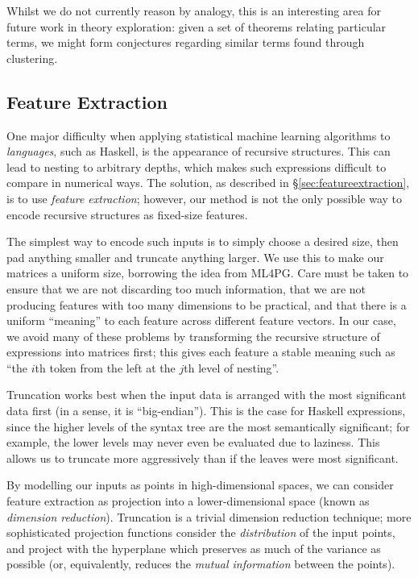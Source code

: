 Whilst we do not currently reason by analogy, this is an interesting area for future work in theory exploration: given a set of theorems relating particular terms, we might form conjectures regarding similar terms found through clustering.

\iffalse
We could expand this a bit, e.g. talking about how we both use Weka, etc.
\fi

\subsection{Feature Extraction}

One major difficulty when applying statistical machine learning algorithms to \emph{languages}, such as Haskell, is the appearance of recursive structures. This can lead to nesting to arbitrary depths, which makes such expressions difficult to compare in numerical ways. The solution, as described in \S \ref{sec:featureextraction}, is to use \emph{feature extraction}; however, our method is not the only possible way to encode recursive structures as fixed-size features.

The simplest way to encode such inputs is to simply choose a desired size, then pad anything smaller and truncate anything larger. We use this to make our matrices a uniform size, borrowing the idea from ML4PG. Care must be taken to ensure that we are not discarding too much information, that we are not producing features with too many dimensions to be practical, and that there is a uniform ``meaning'' to each feature across different feature vectors. In our case, we avoid many of these problems by transforming the recursive structure of expressions into matrices first; this gives each feature a stable meaning such as ``the $i$th token from the left at the $j$th level of nesting''.

Truncation works best when the input data is arranged with the most significant data first (in a sense, it is ``big-endian''). This is the case for Haskell expressions, since the higher levels of the syntax tree are the most semantically significant; for example, the lower levels may never even be evaluated due to laziness. This allows us to truncate more aggressively than if the leaves were most significant.

By modelling our inputs as points in high-dimensional spaces, we can consider feature extraction as projection into a lower-dimensional space (known as \emph{dimension reduction}). Truncation is a trivial dimension reduction technique; more sophisticated projection functions consider the \emph{distribution} of the input points, and project with the hyperplane which preserves as much of the variance as possible (or, equivalently, reduces the \emph{mutual information} between the points).

